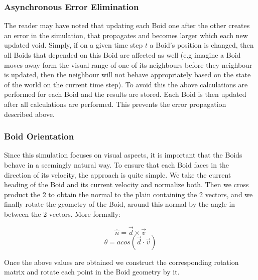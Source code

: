 \documentclass[12pt]{article}
\begin{document}
\subsubsection{Asynchronous Error Elimination}
The reader may have noted that updating each Boid one after the other creates an error in the simulation, that propagates and becomes larger which each new updated void. Simply, if on a given time step $t$ a Boid's position is changed, then all Boids that depended on this Boid are affected as well (e.g imagine a Boid moves away form the visual range of one of its neighbours before they neighbour is updated, then the neighbour will not behave appropriately based on the state of the world on the current time step). To avoid this the above calculations are performed for each Boid and the results are stored.  Each Boid is then updated after all calculations are performed. This prevents the error propagation described above.

\subsubsection{Boid Orientation}
Since this simulation focuses on visual aspects, it is important that the Boids behave in a seemingly natural way. To ensure that each Boid faces in the direction of its velocity, the approach is quite simple. We take the current heading of the Boid and its current velocity and normalize both. Then we cross product the 2 to obtain the normal to the plain containing the 2 vectors, and we finally rotate the geometry of the Boid, around this normal by the angle in between the 2 vectors. More formally:

$$\hat{n}=\vec{d}\times \vec{v}$$
$$\theta = acos(\vec{d}\cdot\vec{v})$$

Once the above values are obtained we construct the corresponding rotation matrix and rotate each point in the Boid geometry by it.
\end{document}

